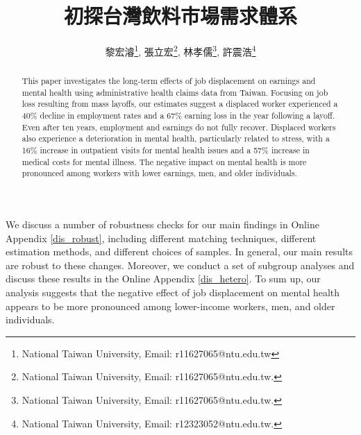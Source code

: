 \documentclass[12pt]{article}
\begin{document}
	
	\title{\Large 初探台灣飲料市場需求體系}
	
	\author{\normalsize 黎宏濬\thanks{National Taiwan University, Email: r11627065@ntu.edu.tw}, 張立宏\thanks{National Taiwan University, Email: r11627065@ntu.edu.tw.},  林孝儒\thanks{National Taiwan University, Email: r11627065@ntu.edu.tw.},  許震浩\thanks{National Taiwan University, Email: r12323052@ntu.edu.tw.} \medskip}
	
	
	\maketitle
	
\begin{abstract}
This paper investigates the long-term effects of job displacement on earnings and mental health using administrative health claims data from Taiwan. Focusing on job loss resulting from mass layoffs, our estimates suggest a displaced worker experienced a 40\% decline in employment rates and a 67\% earning loss in the year following a layoff. Even after ten years, employment and earnings do not fully recover. Displaced workers also experience a deterioration in mental health, particularly related to stress, with a 16\% increase in outpatient visits for mental health issues and a 57\% increase in medical costs for mental illness. The negative impact on mental health is more pronounced among workers with lower earnings, men, and older individuals.
	
\end{abstract}


\newpage














\subsection{}
We discuss a number of robustness checks for our main findings in Online Appendix \ref{dis_robust}, including different matching techniques, different estimation methods, and different choices of samples. In general, our main results are robust to these changes. Moreover, we conduct a set of subgroup analyses and discuss these results in the Online Appendix \ref{dis_hetero}. To sum up, our analysis suggests that the negative effect of job displacement on mental health appears to be more pronounced among lower-income workers, men, and older individuals.
\end{document}
